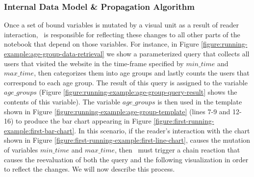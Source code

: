 \subsubsection*{Internal Data Model \&  Propagation Algorithm}
\label{section:change-propagation-datamodel}




Once a set of bound variables is mutated by a visual unit as a result of reader interaction, \projname\ is responsible for reflecting these changes to all other parts of the notebook that depend on those variables. For instance, in Figure \ref{figure:running-example:age-group-data-retrieval} we show a parameterized query that collects all users that visited the website in the time-frame specified by $min\_time$ and $max\_time$, then categorizes them into age groups and lastly counts the users that correspond to each age group. The result of this query is assigned to the variable $age\_groups$ (Figure \ref{figure:running-example:age-group-query-result} shows the contents of this variable). The variable $age\_groups$ is then used in the template shown in Figure \ref{figure:running-example:age-group-template} (lines 7-9 and 12-16) to produce the bar chart appearing in Figure \ref{figure:first-running-example:first-bar-chart}. In this scenario, if the reader's interaction with the chart shown in Figure \ref{figure:first-running-example:first-line-chart}, causes the mutation of variables $min\_time$ and $max\_time$, then \projname\ must trigger a chain reaction that causes the reevaluation of both the query and the following visualization in order to reflect the changes. We will now describe this process.



